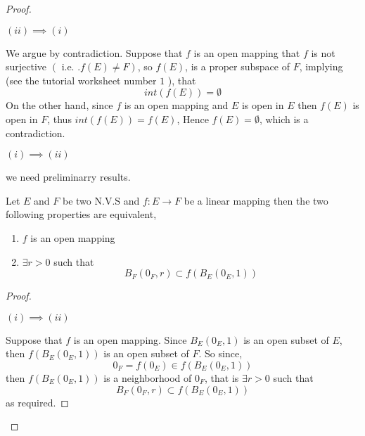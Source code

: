 \begin{proof}
\begin{center}
	$(ii)  \implies  (i) $  
\end{center}
We argue by contradiction. Suppose that $f $ is an open mapping
that $f $ is not surjective $(\text{ i.e. } . f(E)  \neq  F)  $, 
so $f(E) $, is a proper subspace of $F $, implying (see
the tutorial worksheet number $1 $ ), that 
\[
	int(f(E) )  = \emptyset 
\]
On the other hand, 
since $f $ is an open mapping and $E $ is open
in $E $ then $f(E)  $  is open in $F $, thus 
$int ( f(E))  = f(E)  $, Hence $f(E) = \emptyset   $, which is a contradiction.

\begin{center}
	$(i)  \implies  (ii)  $ 
\end{center}
we need preliminarry results.


\begin{theorem}[]
Let $E $ and $F $ be two N.V.S and 
$ f : E \longrightarrow F $ be a linear mapping 
then the two following properties are equivalent,
\begin{enumerate}[i]
\item  $f $ is an open mapping 
\item $\exists r > 0 $ such that 
	\[
	B_{F}(0_{F},r) \subset   f\left( B_{E}(0_{E},1)  \right) 
	\]
\end{enumerate}
\end{theorem}
\begin{proof}
	\begin{center}
		$(i)  \implies (ii)  $  
	\end{center}
	Suppose that $f $ is an open mapping. Since
	$B_{E}(0_{E}, 1)  $  is an open 
	subset of $E $, then 
	$f(B_{E}(0_{E},1) )  $  is an open subset of 
	$F $.
	So since,
	\[
	0_{F} = f(0_{E})  \in  f(B_{E}(0_{E},1) ) 
	\]
         then $f(B_{E}(0_{E},1) )  $  is a neighborhood of $0_{F} $, 
	 that is $\exists r > 0 $ such that 
	 \[
	 B_{F}(0_{F},r)   \subset f(B_{E}(0_{E},1) )  
	 \]
	 as required.
\end{proof}
\end{proof}
% 

